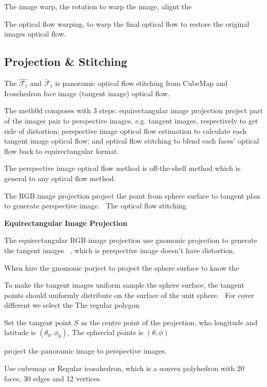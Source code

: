 The image warp, the rotation to warp the image, alignt the 

The optical flow warping, to warp the final optical flow to restore the original images optical flow.


\subsection{Projection \& Stitching}
\label{sec:approach:projstit}

The $\hat{\mathcal{F}_t}$ and $\tilde{\mathcal{F}}_t$ is panoramic optical flow stitching from CubeMap and Icosehedron face image (tangent image) optical flow.

The meth0d composes with 3 steps:
 equirectangular image projection project part of the images pair to perspective images, e.g. tangent images, respectively to get ride of distortion;
 perspective image optical flow estimation to calculate each tangent image optical flow;
 and optical flow stitching to blend each faces' optical flow back to equirectangular format. 
 
 The perspective image optical flow method is off-the-shelf method which is general to any optical flow method.

The RGB image projection project the point from sphere surface to tangent plan to generate perspective image.~\cite{??}
The optical flow stitching 

\textbf{Equirectangular Image Projection}


The equirectangular RGB image projection use gnomonic projection to generate the tangent images ~\cite{??}, which is perspective image doesn't have distortion.

When hire the gnomonic porject to project the sphere surface to know the 

To make the tangent images uniform sample the sphere surface, the tangent points should uniformly distribute on the surface of the unit sphere.~\cite{??}
For cover different we select the 
The regular polygon ~\cite{??} 


Set the tangent point $S$ as the centre point of the projection, who longitude and latitude is $(\theta_0, \phi_0)$,
The sphercial points is $(\theta, \phi)$

project the panoramic image to perspective images.

Use cubemap or Regular icosahedron, which is a convex polyhedron with 20 faces, 30 edges and 12 vertices.


